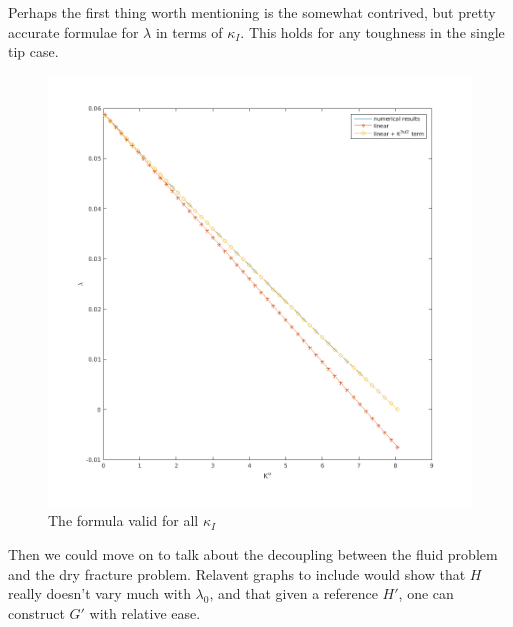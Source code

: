 \documentclass{jfm}
\begin{document}
Perhaps the first thing worth mentioning is the somewhat contrived, but pretty
accurate formulae for $\lambda$ in terms of $\kappa_I$. This holds for any 
toughness in the single tip case.
\begin{figure}
 \centerline{
\includegraphics[scale=0.3]{./../../Graphs/overall-fit.png}}
  \caption{The formula valid for all $\kappa_I$}
\end{figure}

Then we could move on to talk about the decoupling between the fluid problem
and the dry fracture problem. Relavent graphs to include would show that
$H$ really doesn't vary much with $\lambda_0$, and that given a reference
$H'$, one can construct $G'$ with relative ease.
\end{document}
